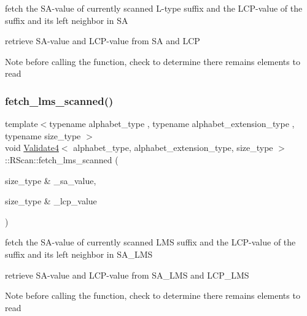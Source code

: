 fetch the S\+A-\/value of currently scanned L-\/type suffix and the L\+C\+P-\/value of the suffix and its left neighbor in SA 

retrieve S\+A-\/value and L\+C\+P-\/value from SA and L\+CP \begin{DoxyNote}{Note}
before calling the function, check to determine there remains elements to read 
\end{DoxyNote}
\mbox{\label{struct_validate4_1_1_r_scan_aaeb8ae64faa2ab76d7467586f3281d97}} 
\subsubsection{\texorpdfstring{fetch\+\_\+lms\+\_\+scanned()}{fetch\_lms\_scanned()}}
{\footnotesize\ttfamily template$<$typename alphabet\+\_\+type , typename alphabet\+\_\+extension\+\_\+type , typename size\+\_\+type $>$ \\
void \hyperlink{class_validate4}{Validate4}$<$ alphabet\+\_\+type, alphabet\+\_\+extension\+\_\+type, size\+\_\+type $>$\+::R\+Scan\+::fetch\+\_\+lms\+\_\+scanned (\begin{DoxyParamCaption}\item[{size\+\_\+type \&}]{\+\_\+sa\+\_\+value,  }\item[{size\+\_\+type \&}]{\+\_\+lcp\+\_\+value }\end{DoxyParamCaption})\hspace{0.3cm}{\ttfamily [inline]}}



fetch the S\+A-\/value of currently scanned L\+MS suffix and the L\+C\+P-\/value of the suffix and its left neighbor in S\+A\+\_\+\+L\+MS 

retrieve S\+A-\/value and L\+C\+P-\/value from S\+A\+\_\+\+L\+MS and L\+C\+P\+\_\+\+L\+MS \begin{DoxyNote}{Note}
before calling the function, check to determine there remains elements to read 
\end{DoxyNote}
\mbox{\label{struct_validate4_1_1_r_scan_a32f26034048e070455cd9b1f56c95b89}} 
